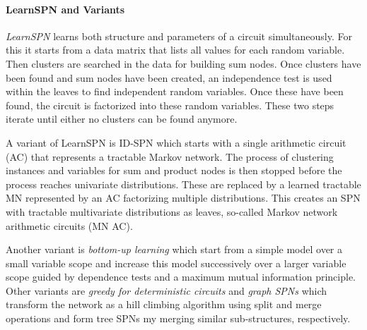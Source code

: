 			\paragraph{LearnSPN and Variants}
				\emph{LearnSPN} learns both structure and parameters of a circuit simultaneously. For this it starts from a data matrix that lists all values for each random variable. Then clusters are searched in the data for building sum nodes. Once clusters have been found and sum nodes have been created, an independence test is used within the leaves to find independent random variables. Once these have been found, the circuit is factorized into these random variables. These two steps iterate until either no clusters can be found anymore.

				A variant of LearnSPN is ID-SPN which starts with a single arithmetic circuit (AC) that represents a tractable Markov network. The process of clustering instances and variables for sum and product nodes is then stopped before the process reaches univariate distributions. These are replaced by a learned tractable MN represented by an AC factorizing multiple distributions. This creates an SPN with tractable multivariate distributions as leaves, so-called Markov network arithmetic circuits (MN AC).

				Another variant is \emph{bottom-up learning} which start from a simple model over a small variable scope and increase this model successively over a larger variable scope guided by dependence tests and a maximum mutual information principle. Other variants are \emph{greedy for deterministic circuits} and \emph{graph SPNs} which transform the network as a hill climbing algorithm using split and merge operations and form tree SPNs my merging similar sub-structures, respectively.


